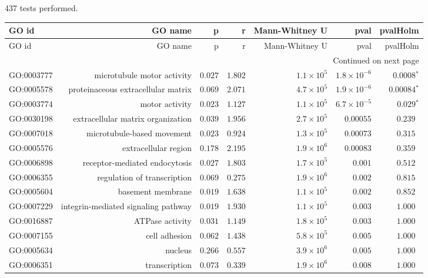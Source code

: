 \documentclass{article}
\begin{document}
437 tests performed.\tiny
\begin{longtable}{|l|r|r|r|r|r|r|}
\toprule
GO id & GO name & p & r & Mann-Whitney U & pval & pvalHolm \\
\midrule
\endfirsthead
\toprule
GO id & GO name & p & r & Mann-Whitney U & pval & pvalHolm \\
\midrule
\endhead
\midrule
\multicolumn{7}{r}{Continued on next page} \\
\midrule
\endfoot
\bottomrule
\endlastfoot
GO:0003777 & microtubule motor activity & $ 0.027$ & $ 1.802$ & $1.1\times 10^{5}$ & $1.8\times 10^{-6}$ & $\bm{0.0008{^*}}$ \\
GO:0005578 & proteinaceous extracellular matrix & $ 0.069$ & $ 2.071$ & $4.7\times 10^{5}$ & $1.9\times 10^{-6}$ & $\bm{0.00084{^*}}$ \\
GO:0003774 & motor activity & $ 0.023$ & $ 1.127$ & $1.1\times 10^{5}$ & $6.7\times 10^{-5}$ & $\bm{ 0.029{^*}}$ \\
GO:0030198 & extracellular matrix organization & $ 0.039$ & $ 1.956$ & $2.7\times 10^{5}$ & $0.00055$ & $ 0.239~~$ \\
GO:0007018 & microtubule-based movement & $ 0.023$ & $ 0.924$ & $1.3\times 10^{5}$ & $0.00073$ & $ 0.315~~$ \\
GO:0005576 & extracellular region & $ 0.178$ & $ 2.195$ & $1.9\times 10^{6}$ & $0.00083$ & $ 0.359~~$ \\
GO:0006898 & receptor-mediated endocytosis & $ 0.027$ & $ 1.803$ & $1.7\times 10^{5}$ & $ 0.001$ & $ 0.512~~$ \\
GO:0006355 & regulation of transcription & $ 0.069$ & $ 0.275$ & $1.9\times 10^{6}$ & $ 0.002$ & $ 0.815~~$ \\
GO:0005604 & basement membrane & $ 0.019$ & $ 1.638$ & $1.1\times 10^{5}$ & $ 0.002$ & $ 0.852~~$ \\
GO:0007229 & integrin-mediated signaling pathway & $ 0.019$ & $ 1.930$ & $1.1\times 10^{5}$ & $ 0.003$ & $ 1.000~~$ \\
GO:0016887 & ATPase activity & $ 0.031$ & $ 1.149$ & $1.8\times 10^{5}$ & $ 0.003$ & $ 1.000~~$ \\
GO:0007155 & cell adhesion & $ 0.062$ & $ 1.438$ & $5.8\times 10^{5}$ & $ 0.005$ & $ 1.000~~$ \\
GO:0005634 & nucleus & $ 0.266$ & $ 0.557$ & $3.9\times 10^{6}$ & $ 0.005$ & $ 1.000~~$ \\
GO:0006351 & transcription & $ 0.073$ & $ 0.339$ & $1.9\times 10^{6}$ & $ 0.008$ & $ 1.000~~$ \\

\end{longtable}
\end{document}
